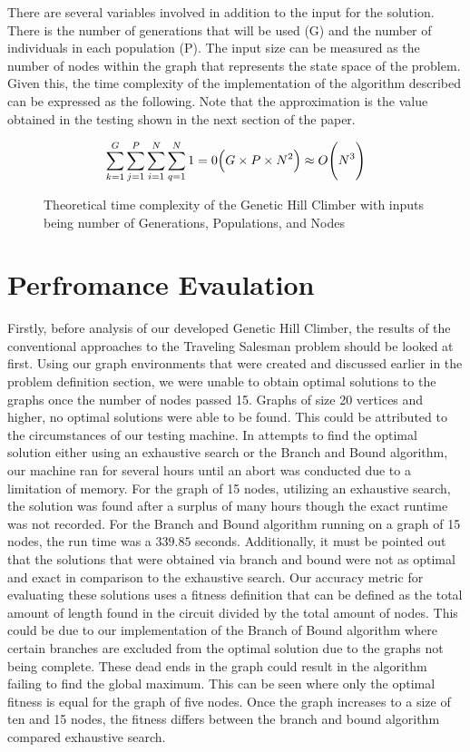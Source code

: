 \documentclass[sigplan,screen]{acmart}
\begin{document}
There are several variables involved in addition to the input for the solution.
There is the number of generations that will be used (G) and the number of
individuals in each population (P). The input size can be measured as the number
of nodes within the graph that represents the state space of the problem. Given
this, the time complexity of the implementation of the algorithm described can
be expressed as the following. Note that the approximation is the value obtained
in the testing shown in the next section of the paper.

\begin{figure}
    \[ \sum_{k=1}^{G}\sum_{j=1}^{P}\sum_{i=1}^{N}\sum_{q=1}^{N}1 = 0\Big(G\times
        P \times N\textsuperscript{2}\Big) \approx
        O\Bigg(N\textsuperscript{3}\Bigg) \]
    \caption{Theoretical time complexity of the Genetic Hill Climber with inputs being number of Generations, Populations, and Nodes}
\end{figure}

\section{Perfromance Evaulation}
Firstly, before analysis of our developed Genetic Hill Climber, the results of
the conventional approaches to the Traveling Salesman problem should be looked
at first. Using our graph environments that were created and discussed earlier
in the problem definition section, we were unable to obtain optimal solutions to
the graphs once the number of nodes passed 15. Graphs of size 20 vertices and
higher, no optimal solutions were able to be found. This could be attributed to
the circumstances of our testing machine. In attempts to find the optimal
solution either using an exhaustive search or the Branch and Bound algorithm,
our machine ran for several hours until an abort was conducted due to a
limitation of memory. For the graph of 15 nodes, utilizing an exhaustive search,
the solution was found after a surplus of many hours though the exact runtime
was not recorded. For the Branch and Bound algorithm running on a graph of 15
nodes, the run time was a $339.85$ seconds. Additionally, it must be pointed out
that the solutions that were obtained via branch and bound were not as optimal
and exact in comparison to the exhaustive search. Our accuracy metric for
evaluating these solutions uses a fitness definition that can be defined as the
total amount of length found in the circuit divided by the total amount of
nodes. This could be due to our implementation of the Branch of Bound algorithm
where certain branches are excluded from the optimal solution due to the graphs
not being complete. These dead ends in the graph could result in the algorithm
failing to find the global maximum. This can be seen where only the optimal
fitness is equal for the graph of five nodes. Once the graph increases to a size
of ten and 15 nodes, the fitness differs between the branch and bound algorithm
compared exhaustive search.
\end{document}
